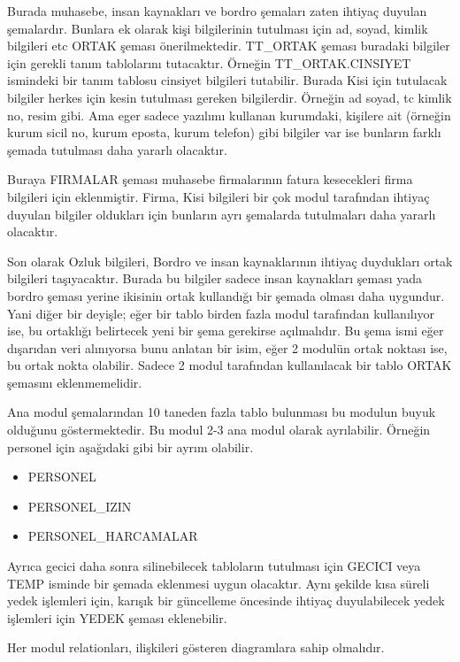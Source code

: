 \documentclass[10pt,a4paper,draft]{article}
\begin{document}
Burada muhasebe, insan kaynakları ve bordro şemaları zaten ihtiyaç duyulan şemalardır.
Bunlara ek olarak kişi bilgilerinin tutulması için ad, soyad, kimlik bilgileri etc ORTAK şeması önerilmektedir. 
TT\_ORTAK şeması buradaki bilgiler için gerekli tanım tablolarını tutacaktır.
Örneğin TT\_ORTAK.CINSIYET ismindeki bir tanım tablosu cinsiyet bilgileri tutabilir.
Burada Kisi için tutulacak bilgiler herkes için kesin tutulması gereken bilgilerdir. 
Örneğin ad soyad, tc kimlik no, resim gibi. 
Ama eger sadece yazılımı kullanan kurumdaki,
kişilere ait  (örneğin kurum sicil no, kurum eposta, kurum telefon) gibi bilgiler  var ise  bunların farklı şemada tutulması daha yararlı olacaktır. 

Buraya FIRMALAR şeması muhasebe firmalarının fatura kesecekleri firma bilgileri için eklenmiştir.
Firma, Kisi bilgileri bir çok modul tarafından ihtiyaç duyulan bilgiler oldukları için bunların ayrı şemalarda tutulmaları daha yararlı olacaktır.

Son olarak Ozluk bilgileri, Bordro ve insan kaynaklarının ihtiyaç duydukları ortak bilgileri taşıyacaktır.
Burada bu bilgiler sadece insan kaynakları şeması yada bordro şeması yerine ikisinin ortak kullandığı bir şemada olması daha uygundur.
Yani diğer bir deyişle; eğer bir tablo birden fazla modul tarafından kullanılıyor ise, bu ortaklığı belirtecek yeni bir şema gerekirse açılmalıdır. 
Bu şema ismi eğer dışarıdan veri alınıyorsa bunu anlatan bir isim, eğer 2 modulün ortak noktası ise, bu ortak nokta olabilir.
Sadece 2 modul tarafından kullanılacak bir tablo ORTAK şemasını eklenmemelidir.

Ana modul şemalarından 10 taneden fazla tablo bulunması bu modulun buyuk olduğunu göstermektedir.
Bu modul 2-3 ana modul olarak ayrılabilir. 
Örneğin personel için aşağıdaki gibi bir ayrım olabilir.


\begin{itemize}
\item PERSONEL
\item PERSONEL\_IZIN
\item PERSONEL\_HARCAMALAR
\end{itemize}


Ayrıca gecici daha sonra silinebilecek tabloların tutulması için GECICI veya TEMP isminde bir şemada eklenmesi uygun olacaktır.
Aynı şekilde kısa süreli yedek işlemleri için, karışık bir güncelleme öncesinde ihtiyaç duyulabilecek yedek işlemleri için YEDEK şeması eklenebilir.



Her modul relationları, ilişkileri gösteren diagramlara sahip olmalıdır.
\end{document}
